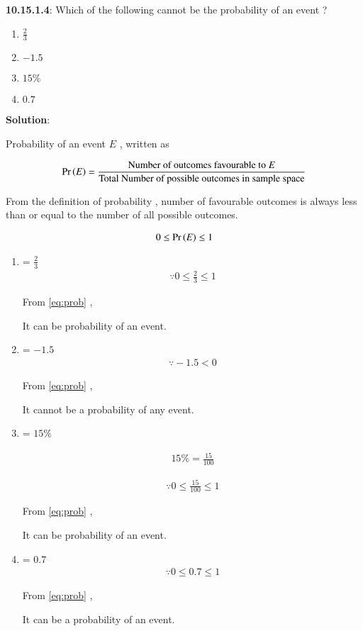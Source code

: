 \documentclass[journal,12pt,twocolumn]{IEEEtran}
\begin{document}
\noindent \textbf{10.15.1.4}:
 Which of the following cannot be the probability of an event ? 

\begin{enumerate}[label=(\Alph*)]
\item $\frac{2}{3}$ 
\item $-1.5$ 
\item $15\%$ 
\item $0.7$ 
\end{enumerate}


\noindent \textbf{Solution}:

Probability of an event $E$ , written as \:

\begin{align}
\label{eq:def}
\Pr\left(E\right)=\frac{\text{Number of outcomes favourable to $E$}}{\text{Total Number of possible outcomes in sample space}}
\end{align}


From the definition of probability , number of favourable outcomes is always less than or equal to the number of all possible outcomes.


\begin{align}
   \label{eq:prob}
   0 \le \Pr\left(E\right)\le 1 
\end{align}
\begin{enumerate}[label=(\Alph*)]
    

\item {} = $\frac{2}{3}$
\begin{align}
    \because 0 \le \frac{2}{3} \le 1
\end{align}

From \eqref{eq:prob} ,

 It can be probability of an event.

\item {} = $-1.5$
\begin{align}
\because  -1.5 < 0 
\end{align}

From \eqref{eq:prob} ,

It cannot be a probability of any event.

\item {} = $15\%$

\begin{align}
15\%=\frac{15}{100}
\end{align}

\begin{align}
\because 0 \le \frac{15}{100} \le 1
\end{align}

From \eqref{eq:prob} ,

\indent It can be probability of an event.

\item {} = $0.7$ 
\begin{align}
\because 0 \le 0.7 \le 1 
\end{align}

From \eqref{eq:prob} ,

It can be a probability of an event.
\end{enumerate}
\end{document}
